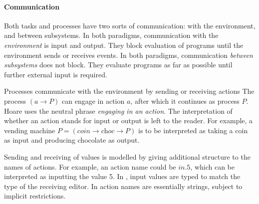 \paragraph{Communication}

Both tasks and processes have two sorts of communication: with the environment, and between subsystems.
In both paradigms, communication with the \emph{environment} is input and output.
They block evaluation of programs until the environment sends or receives events.
In both paradigms, communication \emph{between subsystems} does not block.
They evaluate programs as far as possible until further external input is required.


Processes communicate with the environment by sending or receiving actions
The \CSP process $(a \to P)$ can engage in action $a$, after which it continues as process $P$.
Hoare uses the neutral phrase \emph{engaging in an action}.
The interpretation of whether an action stands for input or output is left to the reader.
For example, a vending machine $P = (\textit{coin} \to \textit{choc} \to P)$ is to be interpreted as taking a coin as input and producing chocolate as output.

Sending and receiving of values is modelled by giving additional structure to the names of actions.
For example, an action name could be $\textit{in}.5$, which can be interpreted as inputting the value 5.
%
In \TOP, input values are typed to match the type of the receiving editor.
In \CSP action names are essentially strings, subject to implicit restrictions.


